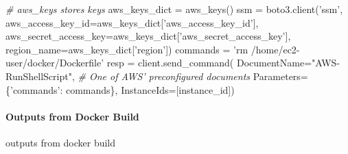 \documentclass[
]{book}
\newenvironment{Shaded}{\begin{snugshade}}{\end{snugshade}}
\newcommand{\CommentTok}[1]{\textcolor[rgb]{0.56,0.35,0.01}{\textit{#1}}}
\newcommand{\ExtensionTok}[1]{#1}
\newcommand{\NormalTok}[1]{#1}
\newcommand{\StringTok}[1]{\textcolor[rgb]{0.31,0.60,0.02}{#1}}
\newcommand{\VariableTok}[1]{\textcolor[rgb]{0.00,0.00,0.00}{#1}}
\begin{document}
\begin{Shaded}
\begin{Highlighting}[]
\CommentTok{# aws_keys stores keys}
\ExtensionTok{aws_keys_dict}\NormalTok{ = aws_keys()}
\ExtensionTok{ssm}\NormalTok{ = boto3.client(}\StringTok{'ssm'}\NormalTok{,}
                   \VariableTok{aws_access_key_id=}\NormalTok{aws_keys_dict[}\StringTok{'aws_access_key_id'}\NormalTok{],}
                   \VariableTok{aws_secret_access_key=}\NormalTok{aws_keys_dict[}\StringTok{'aws_secret_access_key'}\NormalTok{],}
                   \VariableTok{region_name=}\NormalTok{aws_keys_dict[}\StringTok{'region'}\NormalTok{])}
\ExtensionTok{commands}\NormalTok{ = }\StringTok{'rm /home/ec2-user/docker/Dockerfile'}
\ExtensionTok{resp}\NormalTok{ = client.send_command(}
        \VariableTok{DocumentName=}\StringTok{"AWS-RunShellScript"}\NormalTok{, }\CommentTok{# One of AWS' preconfigured documents}
        \VariableTok{Parameters=}\NormalTok{\{}\StringTok{'commands'}\NormalTok{: }\ExtensionTok{commands}\NormalTok{\},}
        \VariableTok{InstanceIds=}\NormalTok{[}\ExtensionTok{instance_id}\NormalTok{])}
\end{Highlighting}
\end{Shaded}

\hypertarget{outputs-from-docker-build}{%
\paragraph{Outputs from Docker Build}\label{outputs-from-docker-build}}

outputs from docker build
\end{document}
